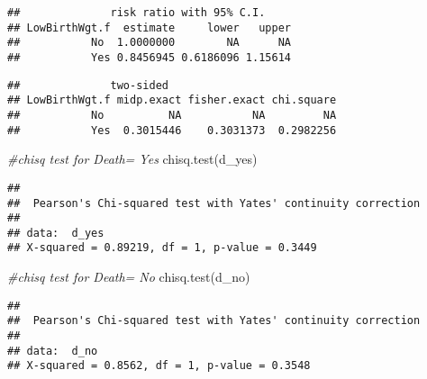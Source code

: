 \documentclass[
]{article}
\newenvironment{Shaded}{\begin{snugshade}}{\end{snugshade}}
\newcommand{\AttributeTok}[1]{\textcolor[rgb]{0.77,0.63,0.00}{#1}}
\newcommand{\CommentTok}[1]{\textcolor[rgb]{0.56,0.35,0.01}{\textit{#1}}}
\newcommand{\FunctionTok}[1]{\textcolor[rgb]{0.00,0.00,0.00}{#1}}
\newcommand{\NormalTok}[1]{#1}
\newcommand{\SpecialCharTok}[1]{\textcolor[rgb]{0.00,0.00,0.00}{#1}}
\newcommand{\StringTok}[1]{\textcolor[rgb]{0.31,0.60,0.02}{#1}}
\begin{document}
\begin{verbatim}
##              risk ratio with 95% C.I.
## LowBirthWgt.f  estimate     lower   upper
##           No  1.0000000        NA      NA
##           Yes 0.8456945 0.6186096 1.15614
\end{verbatim}

\begin{Shaded}
\end{Shaded}

\begin{verbatim}
##              two-sided
## LowBirthWgt.f midp.exact fisher.exact chi.square
##           No          NA           NA         NA
##           Yes  0.3015446    0.3031373  0.2982256
\end{verbatim}

\begin{Shaded}
\begin{Highlighting}[]
\CommentTok{\#chisq test for Death= Yes}
\FunctionTok{chisq.test}\NormalTok{(d\_yes)}
\end{Highlighting}
\end{Shaded}

\begin{verbatim}
## 
##  Pearson's Chi-squared test with Yates' continuity correction
## 
## data:  d_yes
## X-squared = 0.89219, df = 1, p-value = 0.3449
\end{verbatim}

\begin{Shaded}
\begin{Highlighting}[]
\CommentTok{\#chisq test for Death= No}
\FunctionTok{chisq.test}\NormalTok{(d\_no)}
\end{Highlighting}
\end{Shaded}

\begin{verbatim}
## 
##  Pearson's Chi-squared test with Yates' continuity correction
## 
## data:  d_no
## X-squared = 0.8562, df = 1, p-value = 0.3548
\end{verbatim}

\begin{Shaded}
\end{Shaded}
\end{document}
